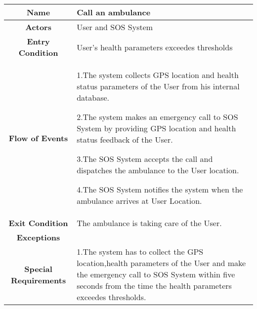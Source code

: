 %
 \begin{table}[h!]
   \centering
    \begin{tabularx}{\linewidth}{|c|X|}
         \hline
         \textbf{Name} & Call an ambulance\\
	\hline
	\textbf{Actors} & User and SOS System\\
	\hline
	\textbf{Entry Condition} & User's health parameters exceedes thresholds\\
	\hline
	\textbf{Flow of Events} & 1.The system collects GPS location and health status parameters of the User from his internal 						database.

					2.The system makes an emergency call to SOS System by providing GPS location and health 							status feedback of the User.

					3.The SOS System accepts the call and dispatches the ambulance to the User location.

					4.The SOS System notifies the system when the ambulance arrives at User Location.\\
	\hline
	\textbf{Exit Condition} & The ambulance is taking care of the User. \\
	\hline
	\textbf{Exceptions} & \\
	\hline
	\textbf{Special Requirements} & 1.The system has to collect the GPS location,health parameters of the User and make the 							emergency call to SOS System within five seconds from the time the health parameters 							exceedes thresholds.\\
        \hline
      \end{tabularx}
      \end{table}

